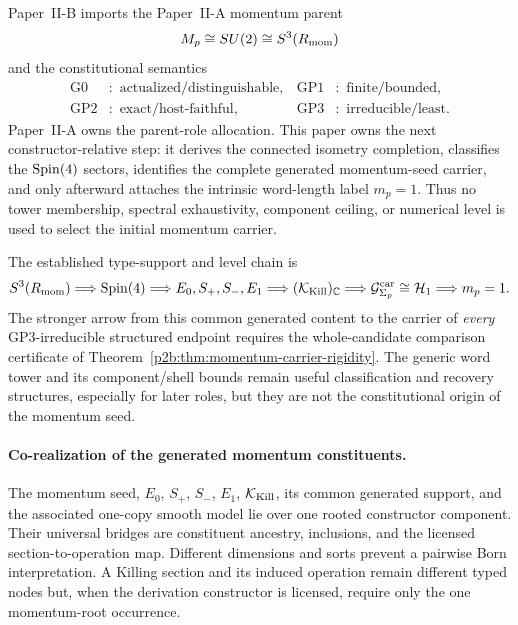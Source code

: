 \documentclass[12pt,a4paper]{article}
\begin{document}
Paper~II-B imports the Paper~II-A momentum parent
\[
 M_p\cong SU(2)\cong S^3(R_{\mathrm{mom}})
\]
and the constitutional semantics
\[
 \begin{aligned}
  \mathrm{G0}&:\text{ actualized/distinguishable},&
  \mathrm{GP1}&:\text{ finite/bounded},\\
  \mathrm{GP2}&:\text{ exact/host-faithful},&
  \mathrm{GP3}&:\text{ irreducible/least}.
 \end{aligned}
\]
Paper~II-A owns the parent-role allocation.  This paper owns the next
constructor-relative step: it derives the connected isometry completion,
classifies the \(\mathrm{Spin}(4)\) sectors, identifies the complete generated
momentum-seed carrier, and only afterward attaches the intrinsic word-length
label \(m_p=1\).  Thus no tower membership, spectral exhaustivity, component
ceiling, or numerical level is used to select the initial momentum carrier.

The established type-support and level chain is
\[
 S^3(R_{\mathrm{mom}})
 \Longrightarrow \mathrm{Spin}(4)
 \Longrightarrow E_0,S_+,S_-,E_1
 \Longrightarrow (\mathcal K_{\rm Kill})_{\mathbb C}
 \Longrightarrow \mathcal G^{\rm car}_{\Sigma_p}\cong\mathcal H_1
 \Longrightarrow m_p=1.
\]
The stronger arrow from this common generated content to the carrier of
\emph{every} GP3-irreducible structured endpoint requires the whole-candidate
comparison certificate of Theorem~\ref{p2b:thm:momentum-carrier-rigidity}.
The generic word tower and its component/shell bounds remain useful
classification and recovery structures, especially for later roles, but they
are not the constitutional origin of the momentum seed.

\paragraph{Co-realization of the generated momentum constituents.}
The momentum seed, \(E_0\), \(S_+\), \(S_-\), \(E_1\),
\(\mathcal K_{\rm Kill}\), its common generated support, and the associated one-copy smooth model lie
over one rooted constructor component.  Their
universal bridges are constituent ancestry, inclusions, and the licensed
section-to-operation map.  Different dimensions and sorts prevent a
pairwise Born interpretation.  A Killing section and its induced operation
remain different typed nodes but, when the derivation constructor is
licensed, require only the one momentum-root occurrence.
\end{document}
